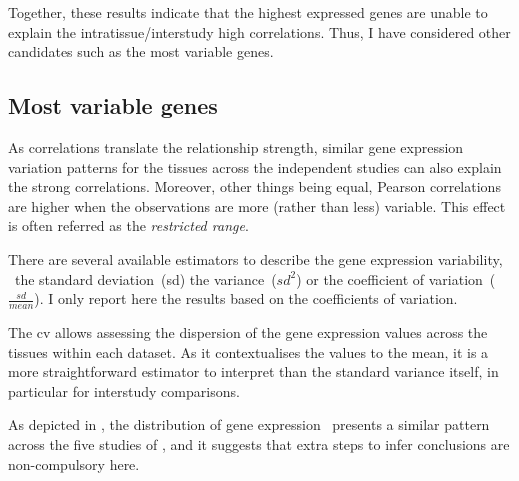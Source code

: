Together, these results indicate
that the highest expressed genes are unable to explain
the intratissue/interstudy high correlations.
Thus, I have considered other candidates
such as the most variable genes.


\subsection{Most variable genes}
As correlations translate the relationship strength,
similar gene expression variation patterns for the tissues
across the independent studies can also explain the strong correlations.
Moreover, other things being equal,
Pearson correlations are higher
when the observations are more (rather than less) variable.
This effect is often referred as
the \emph{restricted range}.~

There are several available estimators to describe the gene expression variability,
\eg\ the standard deviation~(sd) the variance~($sd^2$) or the coefficient of
variation~($\frac{sd}{mean}$).
I only report here the results based on the coefficients of variation.

The \gls{cv} allows assessing
the dispersion of the gene expression values
across the tissues within each dataset.
As it contextualises the values to the mean,
it is a more straightforward estimator to interpret than
the standard variance itself,
in particular for interstudy comparisons.

\begin{comment}
Visualising the \gls{cv} distribution of
gene expression for the working set \setOne\ (see \Cref{fig:HistCV4T})
allows determining whether they are similar across the five transcriptomic studies
or that inferring conclusions requires more cautions.
\end{comment}
As depicted in ,
the distribution of gene expression \cvs\ presents a similar pattern
across the five studies of \setOne,
and it suggests that extra steps to infer conclusions are non-compulsory here.

